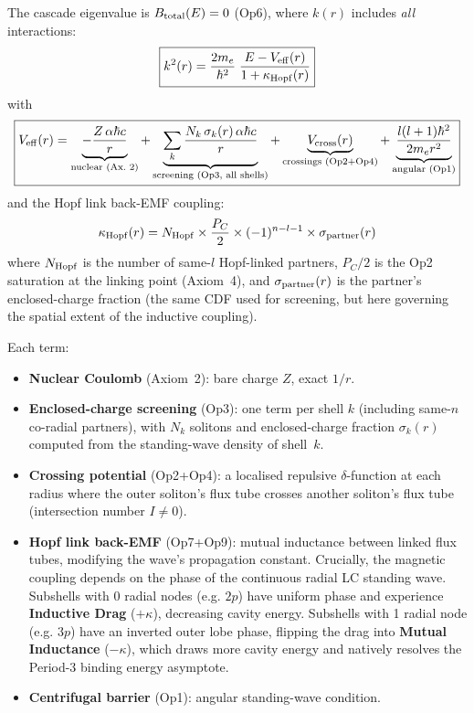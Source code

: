 The cascade eigenvalue is $B_{\rm total}(E) = 0$
(Op6), where $k(r)$ includes \emph{all}
interactions:
\begin{equation}
\boxed{
    k^2(r) = \frac{2 m_e}{\hbar^2}\;
    \frac{E - V_{\rm eff}(r)}{1 + \kappa_{\rm Hopf}(r)}
}
    \label{eq:k_complete}
\end{equation}
with
\begin{equation}
\boxed{
    V_{\rm eff}(r) =
    \underbrace{-\frac{Z\,\alpha\hbar c}{r}}_{\text{nuclear (Ax.~2)}}
    + \underbrace{\sum_k \frac{N_k\,\sigma_k(r)\,
      \alpha\hbar c}{r}}_{\text{screening (Op3, all shells)}}
    + \underbrace{V_{\rm cross}(r)}_{\text{crossings (Op2+Op4)}}
    + \underbrace{\frac{l(l+1)\hbar^2}{2 m_e r^2}}_{\text{angular (Op1)}}
}
    \label{eq:V_complete}
\end{equation}
and the Hopf link back-EMF coupling:
\begin{equation}
    \kappa_{\rm Hopf}(r) =
    N_{\rm Hopf} \times \frac{P_C}{2} \times (-1)^{n - l - 1}
    \times \sigma_{\rm partner}(r)
    \label{eq:kappa_hopf}
\end{equation}
where $N_{\rm Hopf}$ is the number of same-$l$
Hopf-linked partners, $P_C/2$ is the Op2
saturation at the linking point (Axiom~4),
and $\sigma_{\rm partner}(r)$ is the partner's
enclosed-charge fraction (the same CDF used for
screening, but here governing the spatial extent
of the inductive coupling).

\noindent Each term:
\begin{itemize}
    \item \textbf{Nuclear Coulomb} (Axiom~2):
          bare charge $Z$, exact $1/r$.
    \item \textbf{Enclosed-charge screening} (Op3):
          one term per shell $k$ (including
          same-$n$ co-radial partners), with
          $N_k$ solitons and enclosed-charge
          fraction $\sigma_k(r)$ computed from
          the standing-wave density of shell~$k$.
    \item \textbf{Crossing potential} (Op2+Op4):
          a localised repulsive $\delta$-function at
          each radius where the outer soliton's
          flux tube crosses another soliton's
          flux tube (intersection number $I \neq 0$).
    \item \textbf{Hopf link back-EMF} (Op7+Op9):
          mutual inductance between linked flux
          tubes, modifying the wave's propagation
          constant.  Crucially, the magnetic
          coupling depends on the phase of the
          continuous radial LC standing wave.
          Subshells with 0 radial nodes (e.g. $2p$)
          have uniform phase and experience 
          \textbf{Inductive Drag} ($+\kappa$), decreasing
          cavity energy. Subshells with 1 radial node
          (e.g. $3p$) have an inverted outer lobe phase,
          flipping the drag into \textbf{Mutual Inductance}
          ($-\kappa$), which draws more cavity energy
          and natively resolves the Period-3 binding
          energy asymptote.
    \item \textbf{Centrifugal barrier} (Op1):
          angular standing-wave condition.
\end{itemize}

